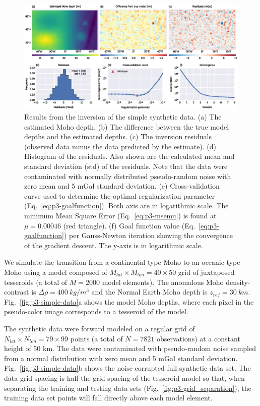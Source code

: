 \begin{figure}
    \centering
    \includegraphics[width=\textwidth]{figures/paper-moho/synthetic-simple-results}
    \caption{
        Results from the inversion of the simple synthetic data.
        (a) The estimated Moho depth.
        (b) The difference between the true model depths
        and the estimated depths.
        (c) The inversion residuals (observed data minus
        the data predicted by the estimate).
        (d) Histogram of the residuals. Also shown are the calculated
        mean and standard deviation (std) of the residuals.
        Note that the data were contaminated with normally distributed
        pseudo-random noise with zero mean and 5 mGal standard deviation.
        (e) Cross-validation curve used to determine the optimal regularization
        parameter (Eq.~\ref{eq:p3-goalfunction}).
        Both axis are in logarithmic scale.
        The minimum Mean Square Error (Eq.~\ref{eq:p3-msemu}) is found at
        $\mu = 0.00046$ (red triangle).
        (f) Goal function value (Eq.~\ref{eq:p3-goalfunction}) per Gauss-Newton
        iteration showing the convergence of the gradient descent.
        The y-axis is in logarithmic scale.
    }
    \label{fig:p3-simple-results}
\end{figure}

We simulate the transition from a continental-type Moho to an oceanic-type Moho
using a model composed of $M_{lat} \times M_{lon} = 40 \times 50$ grid of
juxtaposed tesseroids (a total of $M = 2000$ model elements).
The anomalous Moho density-contrast is $\Delta\rho = 400\ kg/m^3$
and the Normal Earth Moho depth is $z_{ref} = 30\ km$.
Fig.~\ref{fig:p3-simple-data}a shows the model Moho depths,
where each pixel in the pseudo-color image corresponds to
a tesseroid of the model.

The synthetic data were forward modeled on a regular grid of
$N_{lat} \times N_{lon} = 79 \times 99$ points
(a total of $N = 7821$ observations)
at a constant height of 50 km.
The data were contaminated with pseudo-random noise
sampled from a normal distribution with zero mean and 5 mGal standard deviation.
Fig.~\ref{fig:p3-simple-data}b shows the noise-corrupted full synthetic data set.
The data grid spacing is half the grid spacing of the tesseroid model
so that, when separating the training and testing data sets
(Fig.~\ref{fig:p3-grid_separation}),
the training data set points will fall directly above each model element.


